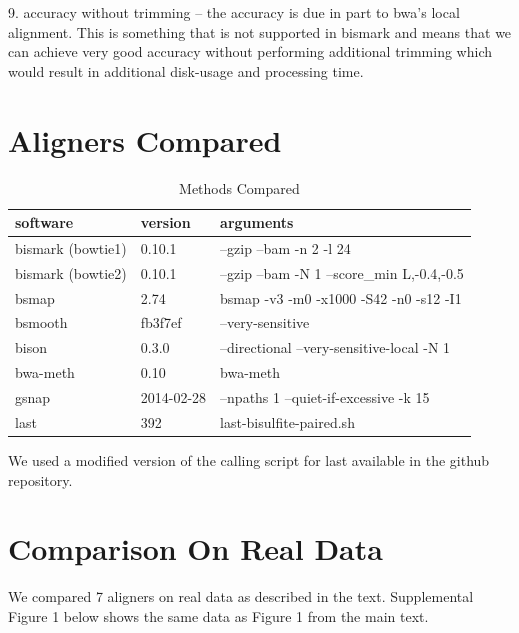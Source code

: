 \documentclass[12pt]{article}
\begin{document}
9. accuracy without trimming -- the accuracy is due in part to bwa's local
   alignment. This is something that is not supported in bismark and means that
   we can achieve very good accuracy without performing additional trimming
   which would result in additional disk-usage and processing time.


\section{Aligners Compared}

\begin{table}[!htp]
\caption{Methods Compared}
{\begin{tabular}{lll}\\\toprule
software & version & arguments\\\midrule
bismark (bowtie1) & 0.10.1 & --gzip --bam -n 2 -l 24\\
bismark (bowtie2) & 0.10.1 & --gzip --bam -N 1 --score\_min L,-0.4,-0.5\\ 
bsmap & 2.74 & bsmap -v3 -m0 -x1000 -S42 -n0 -s12 -I1\\
bsmooth & fb3f7ef & --very-sensitive\\
bison & 0.3.0 & --directional --very-sensitive-local -N 1\\
bwa-meth & 0.10 & bwa-meth\\
gsnap & 2014-02-28 & --npaths 1 --quiet-if-excessive -k 15\\
last & 392 & last-bisulfite-paired.sh\\\bottomrule
\end{tabular}}
\end{table}
We used a modified version of the calling script for last available in the
github repository.

\section{Comparison On Real Data}

We compared 7 aligners on real data as described in the text. Supplemental
Figure 1 below shows the same data as Figure 1 from the main text.
\end{document}
